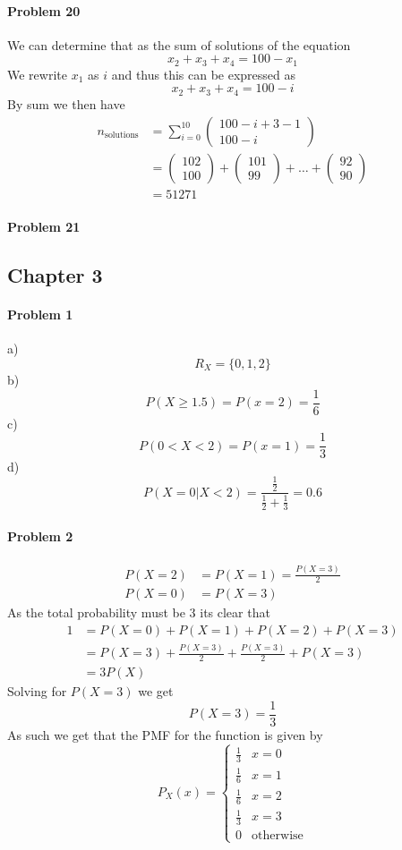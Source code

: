 \paragraph{Problem 20}
We can determine that as the sum of solutions of the equation
\[
    x_{2}+x_{3}+x_{4}=100-x_{1}
\]
We rewrite $x_{1}$ as $i$ and thus this can be expressed as
\[
    x_{2}+x_{3}+x_{4}=100-i
\]
By sum we then have
\begin{align*}
n_{\text{solutions}}&=\sum_{i=0}^{10}\begin{pmatrix}100-i+3-1\\100-i\end{pmatrix} \\
                   &=\begin{pmatrix}102\\100\end{pmatrix}+\begin{pmatrix}101\\99\end{pmatrix}+\ldots+\begin{pmatrix}92\\90\end{pmatrix} \\
                   &=51271
\end{align*}
\paragraph{Problem 21}
\subsection{Chapter 3}
\paragraph{Problem 1}
a)
\[
    R_{X}=\{0,1,2\}
\]
b)
\[
P(X\geq 1.5)=P(x=2)=\frac{1}{6}
\]
c)
\[
    P(0<X<2)=P(x=1)=\frac{1}{3}
\]
d)
\[
    P(X=0|X<2)=\frac{\frac{1}{2}}{\frac{1}{2}+\frac{1}{3}}=0.6
\]
\paragraph{Problem 2}
\begin{align*}
    P(X=2)&=P(X=1)=\frac{P(X=3)}{2} \\
    P(X=0)&=P(X=3)
\end{align*}
As the total probability must be 3 its clear that
\begin{align*}
    1&=P(X=0)+P(X=1)+P(X=2)+P(X=3) \\
     &=P(X=3)+\frac{P(X=3)}{2}+\frac{P(X=3)}{2}+P(X=3) \\
     &=3P(X)
\end{align*}
Solving for $P(X=3)$ we get
\[
    P(X=3)=\frac{1}{3}
\]
As such we get that the PMF for the function is given by
\[
    P_{X}(x)=\begin{cases}\frac{1}{3} & x=0 \\ \frac{1}{6} & x=1 \\ \frac{1}{6} & x=2 \\ \frac{1}{3} & x=3 \\ 0 & \text{otherwise}\end{cases}
\]

